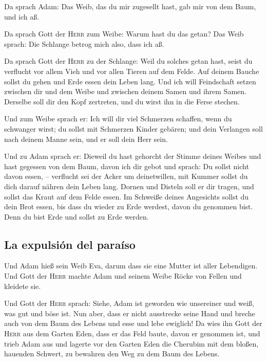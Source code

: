  Da sprach Adam: Das Weib, das du mir zugesellt hast, gab
mir von dem Baum, und ich aß.

 Da sprach Gott der \textsc{Herr} zum Weibe: Warum hast
du das getan? Das Weib sprach: Die Schlange betrog mich also, dass ich
aß.

 Da sprach Gott der \textsc{Herr} zu der Schlange: Weil
du solches getan hast, seist du verflucht vor allem Vieh und vor allen
Tieren auf dem Felde. Auf deinem Bauche sollst du gehen und Erde essen
dein Leben lang.  Und ich will Feindschaft setzen
zwischen dir und dem Weibe und zwischen deinem Samen und ihrem Samen.
Derselbe soll dir den Kopf zertreten, und du wirst ihn in die Ferse
stechen.

 Und zum Weibe sprach er: Ich will dir viel Schmerzen
schaffen, wenn du schwanger wirst; du sollst mit Schmerzen Kinder
gebären; und dein Verlangen soll nach deinem Manne sein, und er soll
dein Herr sein.

 Und zu Adam sprach er: Dieweil du hast gehorcht der
Stimme deines Weibes und hast gegessen von dem Baum, davon ich dir gebot
und sprach: Du sollst nicht davon essen, -- verflucht sei der Acker um
deinetwillen, mit Kummer sollst du dich darauf nähren dein Leben lang.
 Dornen und Disteln soll er dir tragen, und sollst das
Kraut auf dem Felde essen.  Im Schweiße deines Angesichts
sollst du dein Brot essen, bis dass du wieder zu Erde werdest, davon du
genommen bist. Denn du bist Erde und sollst zu Erde werden.

\hypertarget{la-expulsiuxf3n-del-parauxedso}{%
\subsection{La expulsión del
paraíso}\label{la-expulsiuxf3n-del-parauxedso}}

 Und Adam hieß sein Weib Eva, darum dass sie eine Mutter
ist aller Lebendigen.  Und Gott der \textsc{Herr} machte
Adam und seinem Weibe Röcke von Fellen und kleidete sie.

 Und Gott der \textsc{Herr} sprach: Siehe, Adam ist
geworden wie unsereiner und weiß, was gut und böse ist. Nun aber, dass
er nicht ausstrecke seine Hand und breche auch von dem Baum des Lebens
und esse und lebe ewiglich!  Da wies ihn Gott der
\textsc{Herr} aus dem Garten Eden, dass er das Feld baute, davon er
genommen ist,  und trieb Adam aus und lagerte vor den
Garten Eden die Cherubim mit dem bloßen, hauenden Schwert, zu bewahren
den Weg zu dem Baum des Lebens.

